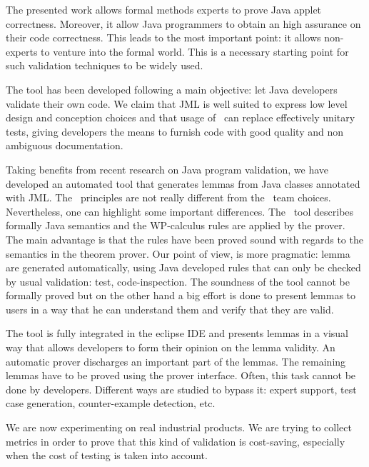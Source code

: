 \label{Conclusion}
 The presented work allows formal methods experts to prove Java applet correctness.
 Moreover, it allow Java programmers to obtain an high assurance on their code correctness.
 This leads to the most important point:
it allows non-experts to venture into the formal world.  This is a necessary starting point for such validation
techniques to be widely used.

  The tool has been developed following a main
 objective: let Java developers validate their own code.  We claim
 that JML is well suited to express low level design and conception
 choices and that usage of \JACK\ can replace effectively unitary tests,
 giving developers the means to furnish code with good quality
 and non ambiguous documentation.

 Taking benefits from recent research on Java program validation, we have
 developed an automated tool that generates lemmas from Java classes
 annotated with JML.
 The \JACK\ principles are not really different from the \LOOP\
 team choices.  Nevertheless, one can highlight some important
 differences.
 The \LOOP\ tool describes formally Java semantics and the WP-calculus rules are applied by the prover.
 The main advantage is that the rules have been proved sound with regards to the semantics in the theorem prover.
 Our point of view, is more pragmatic: lemma are generated automatically, using
 Java developed rules that can only be checked by usual validation: test, code-inspection.
 The soundness of the tool cannot be formally proved but on the other hand a big effort is done to present
 lemmas to users in a way that he can understand them and verify
 that they are valid.

 The tool is fully integrated in the eclipse IDE
 and presents lemmas in a visual way that allows developers to form their
 opinion on the lemma validity.  An automatic prover discharges an
 important part of the lemmas.  The remaining lemmas have to be proved
 using the prover interface.  Often, this task cannot be done by developers.
 Different ways are studied to bypass it: expert support, test case
 generation, counter-example detection, etc.

 We are now experimenting on real industrial products.  We are
 trying to collect metrics in order to prove that this kind of
 validation is cost-saving, especially when the cost of testing is
 taken into account.
